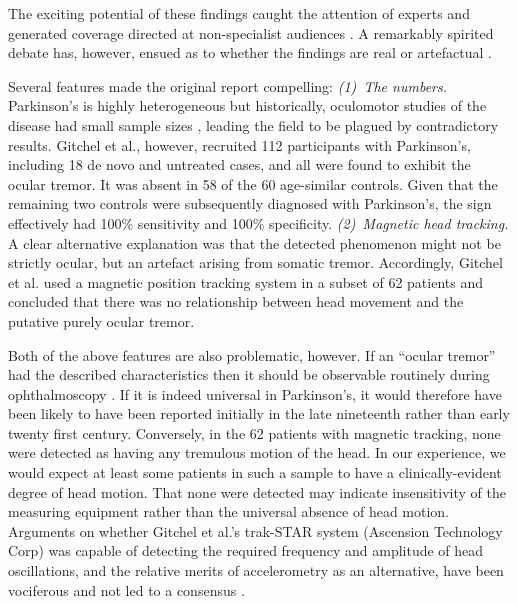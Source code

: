 \documentclass[jou,a4paper]{apa6}
\begin{document}
The exciting potential of these findings caught the attention of experts \citep{Leigh2013Tremor-of-the-e, Willard2014Ocular-motor-di, Bronstein2014EYEE:-exciting-} and generated coverage directed at non-specialist audiences \citep{In-Brief2012Ocular-Tremor-i,Phend2012Eye-tremors-may}. A remarkably spirited debate has, however, ensued as to whether the findings are real \citep{Baron2013Ocular-tremor-i,Baron2014Scientific-data,Duval2013Ocular-tremor-i,Gitchel2014Experimental-su} or artefactual \citep{Kaski2013Eye-oscillation,Kaski2013Ocular-tremor-i,MacAskill2013Ocular-tremor-i,Saifee2014Tremor-of-the-e}. 

Several features made the original report compelling: \textit{(1)~The numbers.} Parkinson's is highly heterogeneous but historically, oculomotor studies of the disease had small sample sizes \citep{Anderson2013Eye-movements-i}, leading the field to be plagued by contradictory results.  Gitchel et al., however, recruited 112 participants with Parkinson's, including 18 de novo and untreated cases, and all were found to exhibit the ocular tremor. It was absent in 58 of the 60 age-similar controls. Given that the remaining two controls were subsequently diagnosed with Parkinson's, the sign effectively had 100\% sensitivity and 100\% specificity. \textit{(2)~Magnetic head tracking.} A clear alternative explanation was that the detected phenomenon might not be strictly ocular, but an artefact arising from somatic tremor. Accordingly, Gitchel et al. used a magnetic position tracking system in a subset of 62 patients and concluded that there was no relationship between head movement and the putative purely ocular tremor.

Both of the above features are also problematic, however. If an ``ocular tremor'' had the described characteristics then it should be observable routinely during ophthalmoscopy \citep{Leigh2013Tremor-of-the-e}. If it is indeed universal in Parkinson's, it would therefore have been likely to have been reported initially in the late nineteenth rather than early twenty first century. Conversely, in the 62 patients with magnetic tracking, none were detected as having any tremulous motion of the head. In our experience, we would expect at least some patients in such a sample to have a clinically-evident degree of head motion. That none were detected may indicate insensitivity of the measuring equipment rather than the universal absence of head motion. Arguments on whether Gitchel et al.'s trak-STAR system (Ascension Technology Corp) was capable of detecting the required frequency and amplitude of head oscillations, and the relative merits of accelerometry as an alternative, have been vociferous and not led to a consensus \citep{MacAskill2013Ocular-tremor-i,Saifee2014Tremor-of-the-e,Kaski2013Eye-oscillation,Baron2013Ocular-tremor-i,Baron2014Scientific-data,Gitchel2014Experimental-su}. 
\end{document}
